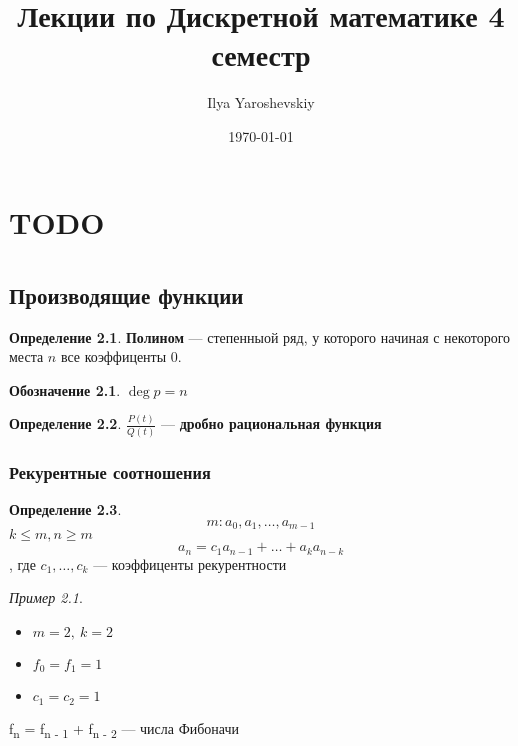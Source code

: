 \documentclass[oneside]{book}
\author{Ilya Yaroshevskiy}
\date{\today}
\title{Лекции по Дискретной математике 4 семестр}
\theoremstyle{plain}
\theoremstyle{remark}
\newtheorem*{examp}{Пример}
\theoremstyle{definition}
\newtheorem*{definition}{Определение}
\newtheorem*{symb}{Обозначение}
\begin{document}
\maketitle
\tableofcontents


\chapter{TODO}
\label{sec:org6c6d170}
\chapter{}
\label{sec:org4d13361}
\section{Производящие функции}
\label{sec:orge6aab1c}
\begin{definition}
\textbf{Полином} --- степенныой ряд, у которого начиная с некоторого места
 \(n\) все коэффиценты 0.
\end{definition}
\begin{symb}
\(\deg p = n\)
\end{symb}
\begin{definition}
\(\frac{P(t)}{Q(t)}\) --- \textbf{дробно рациональная функция}
\end{definition}
\subsection{Рекурентные соотношения}
\label{sec:org859dc60}
\begin{definition}
\[ m: a_0, a_1, \dots, a_{m - 1} \]
\(k \le m, n \ge m\) \[ a_n = c_1a_{n-1} + \dots + a_ka_{n - k} \], где \(c_1, \dots, c_k\) --- коэффиценты рекурентности
\end{definition}
\begin{examp}
\-
\begin{itemize}
\item \(m = 2,\ k = 2\)
\item \(f_0 = f_1 = 1\)
\item \(c_1 = c_2 = 1\)
\end{itemize}
f\textsubscript{n} = f\textsubscript{n - 1} + f\textsubscript{n - 2} --- числа Фибоначи
\end{examp}
\end{document}
